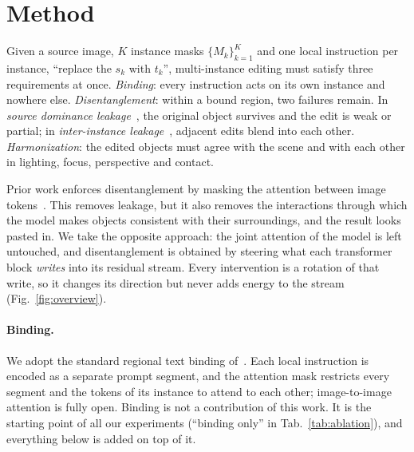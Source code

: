 
\section{Method}
\label{sec:method}

Given a source image, $K$ instance masks $\{M_k\}_{k=1}^{K}$ and one local instruction per instance,
``replace the $s_k$ with $t_k$'', multi-instance editing must satisfy three requirements at once.
\emph{Binding}: every instruction acts on its own instance and nowhere else.
\emph{Disentanglement}: within a bound region, two failures remain. In \emph{source dominance
leakage}~\cite{bindedit}, the original object survives and the edit is weak or partial; in
\emph{inter-instance leakage}~\cite{bindedit,layeredit}, adjacent edits blend into each other.
\emph{Harmonization}: the edited objects must agree with the scene and with each other in lighting,
focus, perspective and contact.

Prior work enforces disentanglement by masking the attention between image tokens~\cite{mice,breakingpoint}.
This removes leakage, but it also removes the interactions through which the model makes objects
consistent with their surroundings, and the result looks pasted in. We take the opposite approach: the
joint attention of the model is left untouched, and disentanglement is obtained by steering what each
transformer block \emph{writes} into its residual stream. Every intervention is a rotation of that write,
so it changes its direction but never adds energy to the stream (Fig.~\ref{fig:overview}).

\paragraph{Binding.}
We adopt the standard regional text binding of~\cite{mice,regionalprompting}. Each local instruction is
encoded as a separate prompt segment, and the attention mask restricts every segment and the tokens of
its instance to attend to each other; image-to-image attention is fully open. Binding is not a
contribution of this work. It is the starting point of all our experiments (``binding only'' in
Tab.~\ref{tab:ablation}), and everything below is added on top of it.


